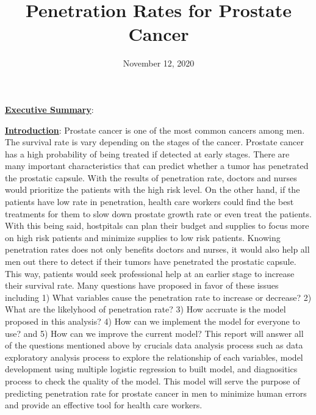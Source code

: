 \documentclass[11pt]{article}\usepackage[]{graphicx}\usepackage[]{color}
\title{Penetration Rates for Prostate Cancer\vspace{-5ex}}
\date{November 12, 2020\vspace{-5ex}}
\begin{document}
 
\maketitle
\hfill \break


















\noindent\textbf{\underline{Executive Summary}}: 
\hfill \break

\noindent\textbf{\underline{Introduction}}: Prostate cancer is one of the most common cancers among men. The survival rate is vary depending on the stages of the cancer. Prostate cancer has a high probability of being treated if detected at early stages. There are many important characteristics that can predict whether a tumor has penetrated the prostatic capsule. With the results of penetration rate, doctors and nurses would prioritize the patients with the high risk level. On the other hand, if the patients have low rate in penetration, health care workers could find the best treatments for them to slow down prostate growth rate or even treat the patients. With this being said, hostpitals can plan their budget and supplies to focus more on high risk patients and minimize supplies to low risk patients. Knowing penetration rates does not only benefits doctors and nurses, it would also help all men out there to detect if their tumors have penetrated the prostatic capsule. This way, patients would seek professional help at an earlier stage to increase their survival rate. Many questions have proposed in favor of these issues including 1) What variables cause the penetration rate to increase or decrease? 2) What are the likelyhood of penetration rate? 3) How accruate is the model proposed in this analysis? 4) How can we implement the model for everyone to use? and 5) How can we improve the current model? This report will answer all of the questions mentioned above by crucials data analysis process such as data exploratory analysis process to explore the relationship of each variables, model development using multiple logistic regression to built model, and diagnositics process to check the quality of the model. This model will serve the purpose of predicting penetration rate for prostate cancer in men to minimize human errors and provide an effective tool for health care workers.
\hfill \break
\end{document}
